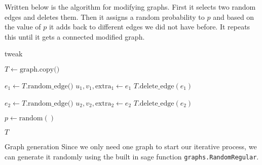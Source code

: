 \documentclass[12pt,a4paper]{amsart}
\makeatletter
\renewcommand\subsection{\@startsection{subsection}{2}
  \z@{.5\linespacing\@plus.7\linespacing}{.5\linespacing}
  {\normalfont\scshape}}
\theoremstyle{definition} %
\theoremstyle{plain} %
\makeatother
\begin{document}
    Written below is the algorithm for modifying graphs. First it selects two random edges and deletes them. Then it assigns a random probability to $p$ and based on the value of $p$ it adds back to different edges we did not have before. It repeats this until it gets a connected modified graph.
    \begin{algorithm}[!htbp]
        \caption{tweak}\label{algo:tweakGraph}
        \LinesNumberedHidden
        \DontPrintSemicolon
        
        
        

            $T \gets \text{graph.copy()}$\;
            
            $e_1 \gets T.\text{random\_edge()}$\;
            $u_1, v_1, \text{extra}_1 \gets e_1$\;
            $T.\text{delete\_edge}(e_1)$\;
            
            $e_2 \gets T.\text{random\_edge()}$\;
            $u_2, v_2, \text{extra}_2 \gets e_2$\;
            $T.\text{delete\_edge}(e_2)$\;
        
            $p \gets \text{random}()$\;
            
            
            \Return $T$\;
        
        
        \end{algorithm}

    
    \pagebreak
    \subsection{Graph generation}
        Since we only need one graph to start our iterative process, we can generate it randomly using the built in sage function \texttt{graphs.RandomRegular}.
\end{document}
